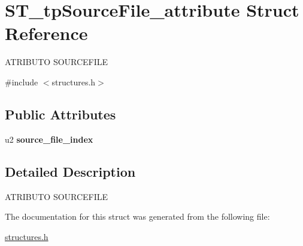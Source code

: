 \hypertarget{structST__tpSourceFile__attribute}{}\section{S\+T\+\_\+tp\+Source\+File\+\_\+attribute Struct Reference}
\label{structST__tpSourceFile__attribute}




 A\+T\+R\+I\+B\+U\+TO S\+O\+U\+R\+C\+E\+F\+I\+LE  




{\ttfamily \#include $<$structures.\+h$>$}

\subsection*{Public Attributes}
\begin{DoxyCompactItemize}
\item 
\mbox{\label{structST__tpSourceFile__attribute_a23b343c899d1a4ec8d16e339b356051a}} 
u2 {\bfseries source\+\_\+file\+\_\+index}
\end{DoxyCompactItemize}


\subsection{Detailed Description}


 A\+T\+R\+I\+B\+U\+TO S\+O\+U\+R\+C\+E\+F\+I\+LE 

The documentation for this struct was generated from the following file\+:\begin{DoxyCompactItemize}
\item 
\mbox{\hyperlink{structures_8h}{structures.\+h}}\end{DoxyCompactItemize}

